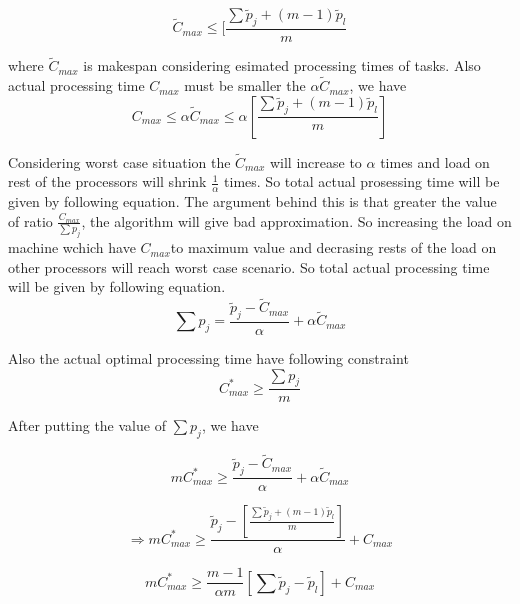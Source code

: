 \documentclass[10pt, conference, compsocconf]{IEEEtran}
\begin{document}
 


 
\begin{equation}
\tilde C_{max}\leq  [\frac{\sum{\tilde p_j + (m-1) \tilde p_l} }{m}
\end{equation}

where $\tilde C_{max}$ is makespan considering esimated processing  times  of tasks.  Also actual processing time  $C_{max}$ must be smaller the $\alpha\tilde C_{max}$, we have \\

\begin{equation}
 C_{max}\leq \alpha \tilde C_{max}\leq \alpha [\frac{\sum{\tilde p_j + (m-1) \tilde p_l} }{m}] 
\end{equation} 

Considering worst case situation the $\tilde C_{max}$ will increase to $\alpha$ times and load on rest of the processors will shrink  $\frac{1}{\alpha}$ times. So total actual prosessing time will be given by following equation.  The argument behind this is that greater the value of ratio $\frac{C_{max}}{\sum{p_j}}$, the algorithm will give bad approximation. So increasing the load on machine wchich have $C_{max} $to maximum
value and decrasing rests of the load on other processors will reach worst case scenario. So total actual processing time will be given by following equation.
 \begin{equation}
 \sum {p_j} = \frac{\tilde p_j- \tilde C_{max}}{\alpha} + \alpha \tilde C_{max}
 \end{equation}
 
 Also the actual optimal processing time have following constraint
 \begin{equation}\nonumber 
C_{max}^{*}\geq \frac{\sum {p_j}}{m}
\end{equation}

After putting the value of  $ \sum {p_j}$, we have

 \begin{equation}\nonumber 
 m C_{max}^{*}\geq \frac{\tilde p_j- \tilde C_{max}}{\alpha} + \alpha \tilde C_{max}
 \end{equation}
 
\begin{equation}\nonumber 
\Rightarrow m C_{max}^{*}\geq \frac{\tilde p_j-[\frac{\sum{\tilde p_j + (m-1) \tilde p_l }}{m}]} {\alpha} + {C_{max}}
\end{equation}

\begin{equation}\nonumber
 m C_{max}^{*}\geq \frac{m-1}{\alpha m} [\sum \tilde p_j-\tilde p_l] + {C_{max}}
 \end{equation}
\end{document}

